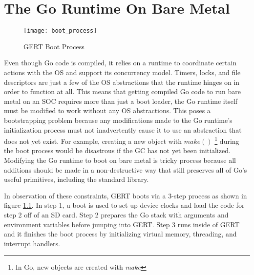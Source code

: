 \chapter{The Go Runtime On Bare Metal}

\begin{figure}[h]
\begin{center}
  \texttt{[image: boot\_process]}
\end{center}
  \caption{GERT Boot Process} \label{fig:boot}
\end{figure}

Even though Go code is compiled, it relies on a runtime to coordinate certain actions with the OS and support its concurrency model.
Timers, locks, and file descriptors are just a few of the OS abstractions that the runtime hinges on
in order to function at all. This means that getting compiled Go code to run bare metal on an SOC requires
more than just a boot loader, the Go runtime itself must be modified to work without any OS abstractions.
This poses a bootstrapping problem because any modifications made to the Go runtime's initialization
process must not inadvertently cause it to use an abstraction that does not yet exist. For example,
creating a new object with $make()$ \footnote{In Go, new objects are created with \textit{make}} during the boot process would be disastrous if the GC has not yet been initialized.
Modifying the Go runtime to boot on bare metal is tricky process because all additions should be made
in a non-destructive way that still preserves all of Go's useful primitives, including the standard library.


In observation of these constraints, GERT boots via a 3-step process as shown in  figure \ref{fig:boot}.
In step 1, u-boot is used to set up device clocks and load the code for step 2 off of an SD card. Step 2 prepares the
Go stack with arguments and environment variables before jumping into GERT. Step 3 runs inside of GERT and it
finishes the boot process by initializing virtual memory, threading, and interrupt handlers.







